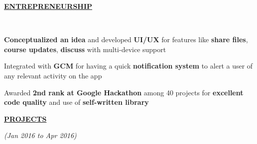 \documentclass[a4paper]{deedy-resume} %
\begin{document}

\sectionspace

{\uppercase\uline{\textbf{\large{Entrepreneurship}}\hfill}}
\microspace

\hfill \\

\begin{tightitemize}
\item \textbf{Conceptualized an idea} and developed \textbf{UI/UX} for features like \textbf{share files}, \textbf{course updates}, \textbf{discuss} with multi-device support
\item Integrated with \textbf{GCM} for having a quick \textbf{notification system} to alert a user of any relevant activity on the app
\item Awarded \textbf{2nd rank at Google Hackathon} among 40 projects for \textbf{excellent code quality} and use of \textbf{self-written library}
\end{tightitemize}

\sectionspace


{\uppercase\uline{\textbf{\large{Projects}}\hfill}}

\microspace

\hfill {\textit{\small(Jan 2016 to Apr 2016)}}\\
\end{document}
